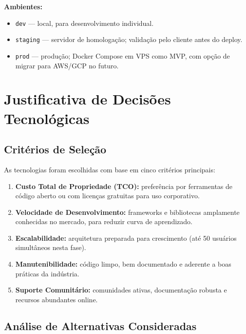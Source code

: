 \documentclass[12pt,a4paper]{article}
\begin{document}
\vspace{0.8em}
\textbf{Ambientes:}
\begin{itemize}[leftmargin=1.5em]
  \item \texttt{dev} — local, para desenvolvimento individual.
  \item \texttt{staging} — servidor de homologação; validação pelo cliente antes do deploy.
  \item \texttt{prod} — produção; Docker Compose em VPS como MVP, com opção de migrar para
    AWS/GCP no futuro.
\end{itemize}

\section{Justificativa de Decisões Tecnológicas}

\subsection{Critérios de Seleção}

As tecnologias foram escolhidas com base em cinco critérios principais:

\begin{enumerate}[leftmargin=1.8em]
  \item \textbf{Custo Total de Propriedade (TCO):} preferência por ferramentas de código aberto
    ou com licenças gratuitas para uso corporativo.
  \item \textbf{Velocidade de Desenvolvimento:} frameworks e bibliotecas amplamente conhecidas
    no mercado, para reduzir curva de aprendizado.
  \item \textbf{Escalabilidade:} arquitetura preparada para crescimento (até 50 usuários
    simultâneos nesta fase).
  \item \textbf{Manutenibilidade:} código limpo, bem documentado e aderente a boas práticas
    da indústria.
  \item \textbf{Suporte Comunitário:} comunidades ativas, documentação robusta e recursos
    abundantes online.
\end{enumerate}

\subsection{Análise de Alternativas Consideradas}
\end{document}
